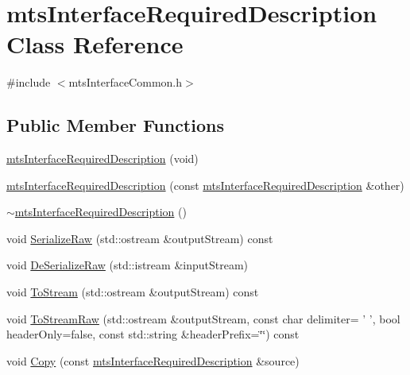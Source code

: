 \hypertarget{classmts_interface_required_description}{\section{mts\-Interface\-Required\-Description Class Reference}
\label{classmts_interface_required_description}
}


{\ttfamily \#include $<$mts\-Interface\-Common.\-h$>$}

\subsection*{Public Member Functions}
\begin{DoxyCompactItemize}
\item 
\hyperlink{classmts_interface_required_description_aaa741ceb61ee4f711938ac9b9f06046a}{mts\-Interface\-Required\-Description} (void)
\item 
\hyperlink{classmts_interface_required_description_af90da365e04969de0cb21a5a788732b6}{mts\-Interface\-Required\-Description} (const \hyperlink{classmts_interface_required_description}{mts\-Interface\-Required\-Description} \&other)
\item 
\hyperlink{classmts_interface_required_description_a632f622ee945050843e2304402d4cfe3}{$\sim$mts\-Interface\-Required\-Description} ()
\item 
void \hyperlink{classmts_interface_required_description_aa5f6037f3381b6afda5b9873cd20d7a2}{Serialize\-Raw} (std\-::ostream \&output\-Stream) const 
\item 
void \hyperlink{classmts_interface_required_description_a37f451181a83b4ab25478861ccb2e1e9}{De\-Serialize\-Raw} (std\-::istream \&input\-Stream)
\item 
void \hyperlink{classmts_interface_required_description_ac2c3623e9e10f3fbfe393ae7418cd94c}{To\-Stream} (std\-::ostream \&output\-Stream) const 
\item 
void \hyperlink{classmts_interface_required_description_a994e1b82aa21b7bea9e199ab6e89979e}{To\-Stream\-Raw} (std\-::ostream \&output\-Stream, const char delimiter= ' ', bool header\-Only=false, const std\-::string \&header\-Prefix=\char`\"{}\char`\"{}) const 
\item 
void \hyperlink{classmts_interface_required_description_ae03fdf98cb5fb0404ddf7e8698fcc10e}{Copy} (const \hyperlink{classmts_interface_required_description}{mts\-Interface\-Required\-Description} \&source)
\item 

\end{DoxyCompactItemize}
